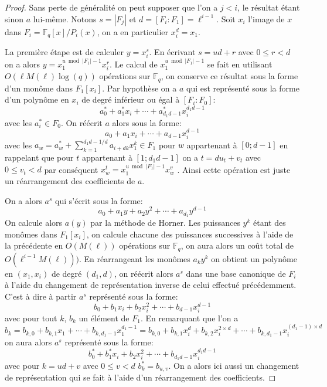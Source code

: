 \documentclass[10pt,a4paper]{book}
\theoremstyle{plain}
\theoremstyle{definition}
\theoremstyle{definition}
\theoremstyle{definition}
\theoremstyle{definition}
\theoremstyle{remark}
\theoremstyle{remark}
\begin{document}
\begin{proof}
Sans perte de généralité on peut supposer que l'on a $j<i$, le résultat étant sinon $a$ lui-même. Notons $s= |F_j|$ et $d=[F_i:F_1]=\ell^{i-1}$. Soit $x_i$ l'image de $x$ dans $F_i=\mathbb{F}_q[x]/P_i(x)$, on a en particulier $x_i^d=x_1$.

La première étape est de calculer $y=x_i^s$. En écrivant $s=ud+r$ avec $0 \leqslant r < d$ on a alors $y=x_1^{u \bmod |F_1|-1}x_i^r$. Le calcul de $x_1^{u \bmod |F_1|-1}$ se fait en utilisant $O(\ell M(\ell) \log(q))$ opérations sur $\mathbb{F}_q$, on conserve ce résultat sous la forme d'un monôme dans $F_1[x_i]$. Par hypothèse on a $a$ qui est représenté sous la forme d'un polynôme en $x_i$ de degré inférieur ou égal à $[F_i:F_0]$: 
\begin{equation*}
a^*_0+a_1^*x_i+ \cdots + a^*_{d_1d-1}x_i^{d_1d-1}
\end{equation*}
avec les $a_i^* \in F_0$. On réécrit $a$ alors sous la forme:
\begin{equation*}
a_0+a_1x_i+ \cdots + a_{d-1}x_i^{d-1}
\end{equation*}
avec les $a_w=a_w^* + \sum_{k=1}^{d_1d-1/d}a_{i+dk}x_1^k \in F_1$ pour $w$ appartenant à $[0; d-1]$ en rappelant que pour $t$ appartenant à $[1; d_1d-1]$ on a $t=d u_t+v_t$ avec $0 \leqslant v_t<d$ par conséquent $x_w^t=x_1^{u \bmod |F_1|-1}x_w^{v}$ . Ainsi cette opération est juste un réarrangement des coefficients de $a$.

On a alors $a^s$ qui s'écrit sous la forme:
\begin{equation*}
a_0 + a_1 y + a_2 y^2 + \cdots + a_{d_1}y^{d-1}
\end{equation*}
On calcule alors $a(y)$ par la méthode de Horner. Les puissances $y^k$ étant des monômes dans $F_1[x_i]$, on calcule chacune des puissances successives à l'aide de la précédente en $O(M(\ell))$ opérations sur $\mathbb{F}_q$, on aura alors un coût total de $O(\ell^{i-1}M(\ell)))$. En réarrangeant les monômes $a_k y^k$ on obtient un polynôme en $(x_1,x_i)$ de degré $(d_1,d)$, on réécrit alors $a^s$ dans une base canonique de $F_i$ à l'aide du changement de représentation inverse de celui effectué précédemment. C'est à dire à partir $a^s$ représenté sous la forme:
\begin{equation*}
b_0 + b_1 x_i + b_2 x_i^2 + \cdots + b_{d-1}x_i^{d-1}
\end{equation*}
avec pour tout $k$, $b_k$ un élément de $F_1$. En remarquant que l'on a 
\begin{equation*}
 b_k=b_{k,0} + b_{k,1}x_1 + \cdots + b_{k,d_1-1} x_1^{d_1-1}=b_{k,0} + b_{k,1}x_i^d + b_{k,2} x_i^{2 \times d} + \cdots + b_{k,d_1-1} x_i^{(d_1-1)\times d} 
\end{equation*}
on aura alors $a^s$ représenté sous la forme:
\begin{equation*}
b_0^* + b_1^* x_i + b_2 x_i^2 + \cdots + b_{d_1d-1} x_i^{d_1d-1}
\end{equation*}
avec pour $k=ud+v$ avec $0 \leqslant v < d$ $b_k^*=b_{u,v}$. On a alors ici aussi un changement de représentation qui se fait à l'aide d'un réarrangement des coefficients.
\end{proof}
\end{document}
